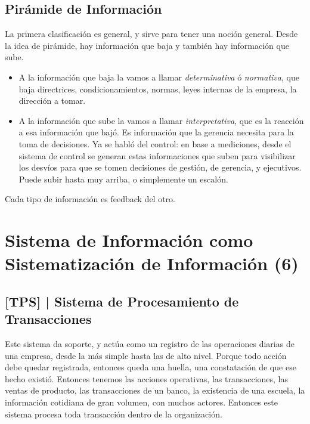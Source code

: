 \hypertarget{piruxe1mide-de-informaciuxf3n}{%
\subsection{Pirámide de
Información}\label{piruxe1mide-de-informaciuxf3n}}

La primera clasificación es general, y sirve para tener una noción
general. Desde la idea de pirámide, hay información que baja y también
hay información que sube. 
\begin{itemize}
\item A la información que baja la vamos a llamar
\emph{determinativa} ó \emph{normativa}, que baja directrices,
condicionamientos, normas, leyes internas de la empresa, la dirección a
tomar. 
\item A la información que sube la vamos a llamar
\emph{interpretativa}, que es la reacción a esa información que bajó. Es
información que la gerencia necesita para la toma de decisiones. Ya se
habló del control: en base a mediciones, desde el sistema de control se
generan estas informaciones que suben para visibilizar los desvíos para
que se tomen decisiones de gestión, de gerencia, y ejecutivos. Puede
subir hasta muy arriba, o simplemente un escalón. 
\end{itemize}

Cada tipo de información es feedback del otro.

\hypertarget{sistema-de-informaciuxf3n-como-sistematizaciuxf3n-de-informaciuxf3n-6}{%
\section{Sistema de Información como Sistematización de Información
(6)}\label{sistema-de-informaciuxf3n-como-sistematizaciuxf3n-de-informaciuxf3n-6}}

\hypertarget{sistema-de-procesamiento-de-transacciones-tps}{%
\subsection{%
{[}TPS{]} |
Sistema de Procesamiento de Transacciones
}\label{sistema-de-procesamiento-de-transacciones-tps}}

Este sistema da soporte, y actúa como un registro de las operaciones
diarias de una empresa, desde la más simple hasta las de alto nivel.
Porque todo acción debe quedar registrada, entonces queda una huella,
una constatación de que ese hecho existió. Entonces tenemos las acciones
operativas, las transacciones, las ventas de producto, las transacciones
de un banco, la existencia de una escuela, la información cotidiana de
gran volumen, con muchos actores. Entonces este sistema procesa toda
transacción dentro de la organización.


